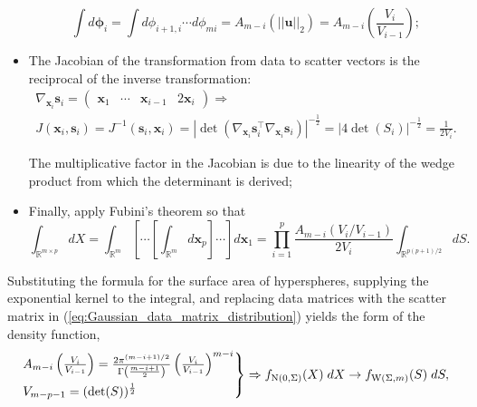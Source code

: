 \documentclass[12pt, twoside, draft]{article}
\begin{document}
\begin{itemize}
\begin{equation}
\int d \boldsymbol{\phi}_i = \int d \phi_{i+1,i} \cdots d \phi_{mi} = A_{m-i} \left( ||\mathbf{u}||_2 \right) = A_{m-i} \left( \frac{V_i}{V_{i-1}} \right);
\end{equation}
\item The Jacobian of the transformation from data to scatter vectors is the reciprocal of the inverse transformation:
\begin{multline}
\nabla_{\mathbf{x}_i} \mathbf{s}_i = \begin{pmatrix} \mathbf{x}_1 & \cdots & \mathbf{x}_{i-1} & 2 \mathbf{x}_i \end{pmatrix} \Rightarrow \\
J(\mathbf{x}_i, \mathbf{s}_i) = J^{-1}(\mathbf{s}_i, \mathbf{x}_i) = |\operatorname{det} \left( \nabla_{\mathbf{x}_i} \mathbf{s}_i^\top \nabla_{\mathbf{x}_i} \mathbf{s}_i \right)|^{-\frac{1}{2}} = |4 \operatorname{det} (S_i)|^{-\frac{1}{2}} = \frac{1}{2V_i}.
\end{multline}

The multiplicative factor in the Jacobian is due to the linearity of the wedge product from which the determinant is derived;

\item Finally, apply Fubini's theorem so that
\begin{equation}
\int_{\mathbb{R}^{m \times p}} dX = \int_{\mathbb{R}^m} \left[ \cdots \left[ \int_{\mathbb{R}^m} d\mathbf{x}_p \right] \cdots \right] d\mathbf{x}_1 = \prod_{i=1}^p \frac{A_{m-i} \left( V_i / V_{i-1} \right)}{2V_i}  \int_{\mathbb{R}^{p(p+1)/2}} dS.
\end{equation}
\end{itemize}

Substituting the formula for the surface area of hyperspheres, supplying the exponential kernel to the integral, and replacing data matrices with the scatter matrix  in (\ref{eq:Gaussian_data_matrix_distribution}) yields the form of the density function,
\begin{equation}
\begin{rcases}
A_{m-i}\left( \frac{V_i}{V_{i-1}} \right) = \frac{2 \pi^{(m-i+1)/2}}{\Gamma \left( \frac{m-i+1}{2} \right)} \left( \frac{V_i}{V_{i-1}} \right)^{m-i} \\
V_{m-p-1} = (\operatorname{det}(S))^{\frac{1}{2}}
\end{rcases} \Rightarrow f_{\operatorname{N}(0, \Sigma)} (X) \; dX \rightarrow f_{\operatorname{W}(\Sigma, m)} (S) \; dS,
\end{equation}
\end{document}
